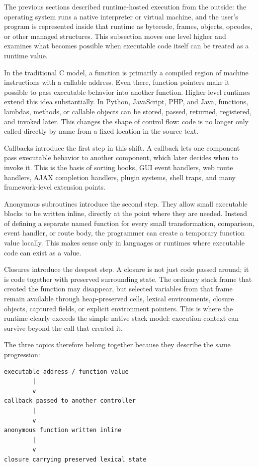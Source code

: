 \documentclass[a4paper,twoside]{report}
\begin{document}
The previous sections described runtime-hosted execution from the outside: the operating system runs a native interpreter or virtual machine, and the user's program is represented inside that runtime as bytecode, frames, objects, opcodes, or other managed structures. This subsection moves one level higher and examines what becomes possible when executable code itself can be treated as a runtime value.

In the traditional C model, a function is primarily a compiled region of machine instructions with a callable address. Even there, function pointers make it possible to pass executable behavior into another function. Higher-level runtimes extend this idea substantially. In Python, JavaScript, PHP, and Java, functions, lambdas, methods, or callable objects can be stored, passed, returned, registered, and invoked later. This changes the shape of control flow: code is no longer only called directly by name from a fixed location in the source text.

Callbacks introduce the first step in this shift. A callback lets one component pass executable behavior to another component, which later decides when to invoke it. This is the basis of sorting hooks, GUI event handlers, web route handlers, AJAX completion handlers, plugin systems, shell traps, and many framework-level extension points.

Anonymous subroutines introduce the second step. They allow small executable blocks to be written inline, directly at the point where they are needed. Instead of defining a separate named function for every small transformation, comparison, event handler, or route body, the programmer can create a temporary function value locally. This makes sense only in languages or runtimes where executable code can exist as a value.

Closures introduce the deepest step. A closure is not just code passed around; it is code together with preserved surrounding state. The ordinary stack frame that created the function may disappear, but selected variables from that frame remain available through heap-preserved cells, lexical environments, closure objects, captured fields, or explicit environment pointers. This is where the runtime clearly exceeds the simple native stack model: execution context can survive beyond the call that created it.

The three topics therefore belong together because they describe the same progression:

\begin{verbatim}
executable address / function value
        |
        v
callback passed to another controller
        |
        v
anonymous function written inline
        |
        v
closure carrying preserved lexical state
\end{verbatim}
\end{document}
